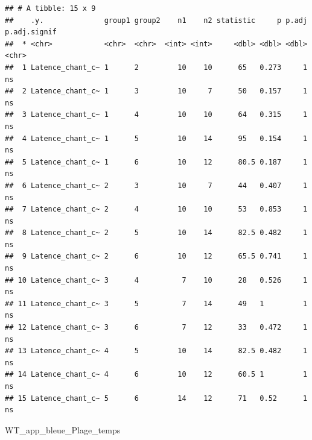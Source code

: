 \documentclass[
  french,
]{article}
\newenvironment{Shaded}{\begin{snugshade}}{\end{snugshade}}
\newcommand{\NormalTok}[1]{#1}
\begin{document}
\begin{verbatim}
## # A tibble: 15 x 9
##    .y.              group1 group2    n1    n2 statistic     p p.adj p.adj.signif
##  * <chr>            <chr>  <chr>  <int> <int>     <dbl> <dbl> <dbl> <chr>       
##  1 Latence_chant_c~ 1      2         10    10      65   0.273     1 ns          
##  2 Latence_chant_c~ 1      3         10     7      50   0.157     1 ns          
##  3 Latence_chant_c~ 1      4         10    10      64   0.315     1 ns          
##  4 Latence_chant_c~ 1      5         10    14      95   0.154     1 ns          
##  5 Latence_chant_c~ 1      6         10    12      80.5 0.187     1 ns          
##  6 Latence_chant_c~ 2      3         10     7      44   0.407     1 ns          
##  7 Latence_chant_c~ 2      4         10    10      53   0.853     1 ns          
##  8 Latence_chant_c~ 2      5         10    14      82.5 0.482     1 ns          
##  9 Latence_chant_c~ 2      6         10    12      65.5 0.741     1 ns          
## 10 Latence_chant_c~ 3      4          7    10      28   0.526     1 ns          
## 11 Latence_chant_c~ 3      5          7    14      49   1         1 ns          
## 12 Latence_chant_c~ 3      6          7    12      33   0.472     1 ns          
## 13 Latence_chant_c~ 4      5         10    14      82.5 0.482     1 ns          
## 14 Latence_chant_c~ 4      6         10    12      60.5 1         1 ns          
## 15 Latence_chant_c~ 5      6         14    12      71   0.52      1 ns
\end{verbatim}

\begin{Shaded}
\begin{Highlighting}[]
\NormalTok{WT\_app\_bleue\_Plage\_temps}
\end{Highlighting}
\end{Shaded}
\end{document}
